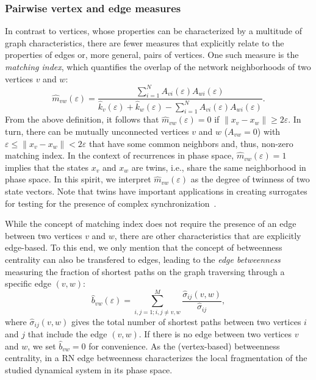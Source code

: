 \documentclass[graybox]{svmult}
\begin{document}
\subsubsection{Pairwise vertex and edge measures}

In contrast to vertices, whose properties can be characterized by a multitude of graph characteristics, there are fewer measures that explicitly relate to the properties of edges or, more general, pairs of vertices. One such measure is the \textit{matching index}, which quantifies the overlap of the network neighborhoods of two vertices $v$ and $w$:
\begin{equation}
\hat{m}_{vw}(\varepsilon)=\frac{\sum_{i=1}^N A_{vi}(\varepsilon) A_{wi}(\varepsilon)}{\hat{k}_v(\varepsilon)+\hat{k}_w(\varepsilon)-\sum_{i=1}^N A_{vi}(\varepsilon) A_{wi}(\varepsilon)}.
\label{eq:matching}
\end{equation}
\noindent
From the above definition, it follows that $\hat{m}_{vw}(\varepsilon)=0$ if $\|x_v-x_w\|\geq 2\varepsilon$. In turn, there can be mutually unconnected vertices $v$ and $w$ ($A_{vw}=0$) with $\varepsilon\leq \|x_v-x_w\|< 2\varepsilon$ that have some common neighbors and, thus, non-zero matching index. In the context of recurrences in phase space, $\hat{m}_{vw}(\varepsilon)=1$ implies that the states $x_v$ and $x_w$ are twins, i.e., share the same neighborhood in phase space. In this spirit, we interpret $\hat{m}_{vw}(\varepsilon)$ as the degree of twinness of two state vectors. Note that twins have important applications in creating surrogates for testing for the presence of complex synchronization~\cite{Thiel2006,Romano2009}.

While the concept of matching index does not require the presence of an edge between two vertices $v$ and $w$, there are other characteristics that are explicitly edge-based. To this end, we only mention that the concept of betweenness centrality can also be transfered to edges, leading to the \textit{edge betweenness} measuring the fraction of shortest paths on the graph traversing through a specific edge $(v,w)$:
\begin{equation}
\hat{b}_{vw}(\varepsilon)=\sum_{i,j=1; i,j\neq v,w}^M \frac{\hat{\sigma}_{ij}(v,w)}{\hat{\sigma}_{ij}},
\label{eq:edgebetweenness}
\end{equation}
\noindent
where $\hat{\sigma}_{ij}(v,w)$ gives the total number of shortest paths between two vertices $i$ and $j$ that include the edge $(v,w)$. If there is no edge between two vertices $v$ and $w$, we set $\hat{b}_{vw}=0$ for convenience. As the (vertex-based) betweenness centrality, in a RN edge betweenness characterizes the local fragmentation of the studied dynamical system in its phase space.
\end{document}

